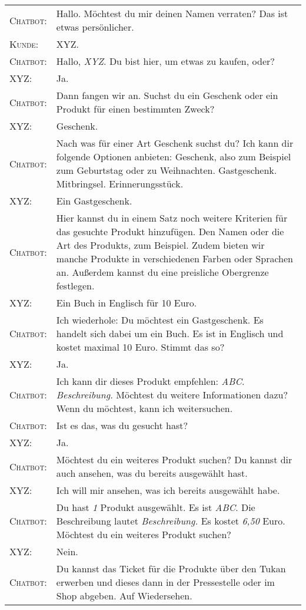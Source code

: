 \begin{center}
\begin{tabular}{p{}p{}}
	\textsc{Chatbot:} & Hallo. Möchtest du mir deinen Namen verraten? Das ist etwas persönlicher. \\
	\textsc{Kunde:} & XYZ.\\
	\textsc{Chatbot:} & Hallo, \textit{XYZ}. Du bist hier, um etwas zu kaufen, oder? \\
	\textsc{XYZ:} & Ja. \\
	\textsc{Chatbot:} & Dann fangen wir an. Suchst du ein Geschenk oder ein Produkt für einen bestimmten Zweck? \\
	\textsc{XYZ:} & Geschenk.\\
	\textsc{Chatbot:} & Nach was für einer Art Geschenk suchst du? Ich kann dir folgende Optionen anbieten: Geschenk, also zum Beispiel zum Geburtstag oder zu Weihnachten. Gastgeschenk. Mitbringsel. Erinnerungsstück.\\
	\textsc{XYZ:} & Ein Gastgeschenk. \\
	\textsc{Chatbot:} & Hier kannst du in einem Satz noch weitere Kriterien für das gesuchte Produkt hinzufügen. Den Namen oder die Art des Produkts, zum Beispiel. Zudem bieten wir manche Produkte in verschiedenen Farben oder Sprachen an. Außerdem kannst du eine preisliche Obergrenze festlegen.\\
	\textsc{XYZ:} & Ein Buch in Englisch für 10 Euro.\\
	\textsc{Chatbot:} & Ich wiederhole: Du möchtest ein Gastgeschenk. Es handelt sich dabei um ein Buch. Es ist in Englisch und kostet maximal 10 Euro. Stimmt das so? \\
	\textsc{XYZ:} & Ja. \\
	\textsc{Chatbot:} & Ich kann dir dieses Produkt empfehlen: \textit{ABC}. \textit{Beschreibung.} Möchtest du weitere Informationen dazu? Wenn du möchtest, kann ich weitersuchen. \\
	\textsc{Chatbot:} & Ist es das, was du gesucht hast?\\
	\textsc{XYZ:} & Ja. \\
	\textsc{Chatbot:} & Möchtest du ein weiteres Produkt suchen? Du kannst dir auch ansehen, was du bereits ausgewählt hast. \\
	\textsc{XYZ:} & Ich will mir ansehen, was ich bereits ausgewählt habe. \\
	\textsc{Chatbot:} & Du hast \textit{1} Produkt ausgewählt. Es ist \textit{ABC}. Die Beschreibung lautet \textit{Beschreibung.} Es kostet \textit{6,50} Euro. Möchtest du ein weiteres Produkt suchen? \\
	\textsc{XYZ:} & Nein.\\
	\textsc{Chatbot:} & Du kannst das Ticket für die Produkte über den Tukan erwerben und dieses dann in der Pressestelle oder im Shop abgeben. Auf Wiedersehen.\\
	\end{tabular}
\end{center}
\vspace{12pt}


